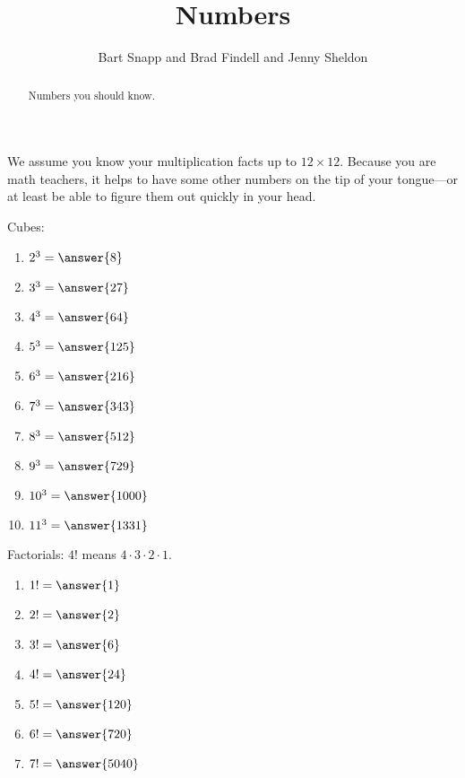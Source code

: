 \documentclass[nooutcomes]{ximera}
\title{Numbers}
\author{Bart Snapp and Brad Findell and Jenny Sheldon}
\begin{document}
\begin{abstract}
Numbers you should know. 
\end{abstract}
\maketitle




We assume you know your multiplication facts up to $12\times 12$. Because you are math teachers, it helps to have some other numbers on the tip of your tongue---or at least be able to figure them out quickly in your head. 


\begin{problem}
Cubes:
\begin{enumerate}
\item $2^3 = \answer{8}$
\item $3^3 = \answer{27}$
\item $4^3 = \answer{64}$
\item $5^3 = \answer{125}$
\item $6^3 = \answer{216}$
\item $7^3 = \answer{343}$
\item $8^3 = \answer{512}$
\item $9^3 = \answer{729}$
\item $10^3 = \answer{1000}$
\item $11^3 = \answer{1331}$
\end{enumerate}
\end{problem}

\begin{problem}
Factorials: $4!$ means $4\cdot3\cdot2\cdot1$.  
\begin{enumerate}
\item $1!= \answer{1}$
\item $2!= \answer{2}$
\item $3!= \answer{6}$
\item $4!= \answer{24}$
\item $5!= \answer{120}$
\item $6!= \answer{720}$
\item $7!= \answer{5040}$
\end{enumerate}
\end{problem}
\end{document}
